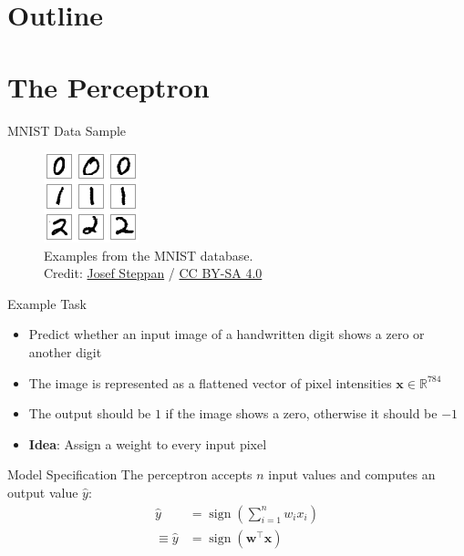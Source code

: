 \documentclass{beamer}
\DeclareMathOperator{\sign}{sign}
\begin{document}
	\section{Outline}
	\section{The Perceptron}
	\begin{frame}{MNIST Data Sample}
		\begin{figure}
			\includegraphics[scale=1.6]{img/mnist}
			\caption{Examples from the {MNIST} database. \\Credit: 
				\href{https://commons.wikimedia.org/wiki/File:MnistExamples.png}{Josef Steppan}
				/ \href{https://creativecommons.org/licenses/by-sa/4.0/deed.en}{CC BY-SA 4.0}}
		\end{figure}
	\end{frame}
	\begin{frame}{Example Task}
		\begin{itemize}
			\item <1-> Predict whether an input image of a handwritten digit shows a zero or another digit
			\item <2-> The image is represented as a flattened vector of pixel intensities $\bm{x} \in \mathbb{R}^{784}$
			\item <3-> The output should be $1$ if the image shows a zero, otherwise it should be $-1$
			\item <4-> \textbf{Idea}: Assign a weight to every input pixel
		\end{itemize}
	\end{frame}
	\begin{frame}{Model Specification}
		The perceptron accepts $n$ input values and computes an output value $\hat{y}$:
		\begin{equation}
			\begin{split}
			\hat{y} &= \sign\left (\sum_{i=1}^{n} w_ix_i\right )\\
			\equiv \hat{y} &= \sign\left (\bm{w}^\top\bm{x}\right )
			\end{split}
		\end{equation}
	\end{frame}
\end{document}
